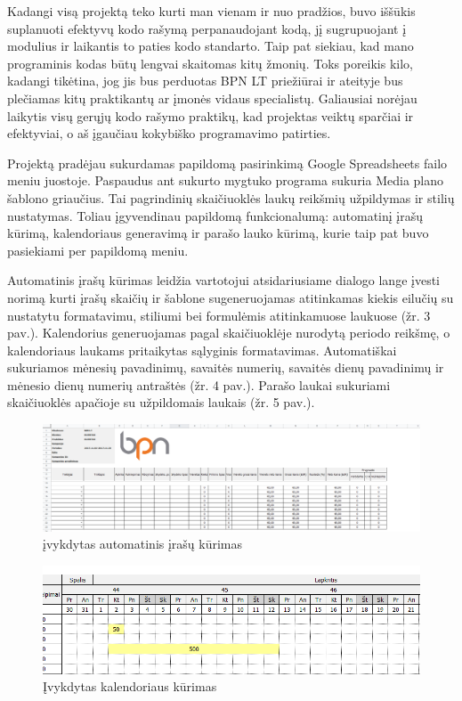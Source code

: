 \documentclass{VUMIFPSkursinis}
\begin{document}
Kadangi visą projektą teko kurti man vienam ir nuo pradžios, buvo iššūkis suplanuoti efektyvų kodo rašymą perpanaudojant kodą, jį sugrupuojant į modulius ir laikantis to paties kodo standarto. Taip pat siekiau, kad mano programinis kodas būtų lengvai skaitomas kitų žmonių. Toks poreikis kilo, kadangi tikėtina, jog jis bus perduotas BPN LT priežiūrai ir ateityje bus plečiamas kitų praktikantų ar įmonės vidaus specialistų. Galiausiai norėjau laikytis visų gerųjų kodo rašymo praktikų, kad projektas veiktų sparčiai ir efektyviai, o aš įgaučiau kokybiško programavimo patirties.

Projektą pradėjau sukurdamas papildomą pasirinkimą Google Spreadsheets failo meniu juostoje. Paspaudus ant sukurto mygtuko programa sukuria Media plano šablono griaučius. Tai pagrindinių skaičiuoklės laukų reikšmių užpildymas ir stilių nustatymas. Toliau įgyvendinau papildomą funkcionalumą: automatinį įrašų kūrimą, kalendoriaus generavimą ir parašo lauko kūrimą, kurie taip pat buvo pasiekiami per papildomą meniu. 

Automatinis įrašų kūrimas leidžia vartotojui atsidariusiame dialogo lange įvesti norimą kurti įrašų skaičių ir šablone sugeneruojamas atitinkamas kiekis eilučių su nustatytu formatavimu, stiliumi bei formulėmis atitinkamuose laukuose (žr. 3 pav.). Kalendorius generuojamas pagal skaičiuoklėje nurodytą periodo reikšmę, o kalendoriaus laukams pritaikytas sąlyginis formatavimas. Automatiškai sukuriamos mėnesių pavadinimų, savaitės numerių, savaitės dienų pavadinimų ir mėnesio dienų numerių antraštės (žr. 4 pav.). Parašo laukai sukuriami skaičiuoklės apačioje su užpildomais laukais (žr. 5 pav.).

\begin{figure}[H]
    \centering
    \includegraphics[scale=0.35]{img/generated-records}
    \caption{įvykdytas automatinis įrašų kūrimas}
    \label{img:model}
\end{figure}

\begin{figure}[H]
    \centering
    \includegraphics[scale=0.75]{img/records-calendar}
    \caption{Įvykdytas kalendoriaus kūrimas}
    \label{img:model}
\end{figure}
\end{document}
